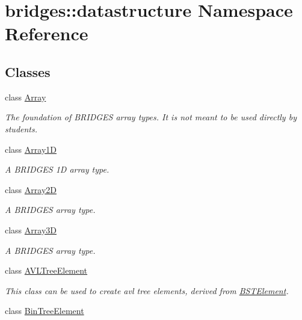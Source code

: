 \hypertarget{namespacebridges_1_1datastructure}{}\section{bridges\+:\+:datastructure Namespace Reference}
\label{namespacebridges_1_1datastructure}
\subsection*{Classes}
\begin{DoxyCompactItemize}
\item 
class \mbox{\hyperlink{classbridges_1_1datastructure_1_1_array}{Array}}
\begin{DoxyCompactList}\small\item\em The foundation of B\+R\+I\+D\+G\+ES array types. It is not meant to be used directly by students. \end{DoxyCompactList}\item 
class \mbox{\hyperlink{classbridges_1_1datastructure_1_1_array1_d}{Array1D}}
\begin{DoxyCompactList}\small\item\em A B\+R\+I\+D\+G\+ES 1D array type. \end{DoxyCompactList}\item 
class \mbox{\hyperlink{classbridges_1_1datastructure_1_1_array2_d}{Array2D}}
\begin{DoxyCompactList}\small\item\em A B\+R\+I\+D\+G\+ES array type. \end{DoxyCompactList}\item 
class \mbox{\hyperlink{classbridges_1_1datastructure_1_1_array3_d}{Array3D}}
\begin{DoxyCompactList}\small\item\em A B\+R\+I\+D\+G\+ES array type. \end{DoxyCompactList}\item 
class \mbox{\hyperlink{classbridges_1_1datastructure_1_1_a_v_l_tree_element}{A\+V\+L\+Tree\+Element}}
\begin{DoxyCompactList}\small\item\em This class can be used to create avl tree elements, derived from \mbox{\hyperlink{classbridges_1_1datastructure_1_1_b_s_t_element}{B\+S\+T\+Element}}. \end{DoxyCompactList}\item 
class \mbox{\hyperlink{classbridges_1_1datastructure_1_1_bin_tree_element}{Bin\+Tree\+Element}}

\end{DoxyCompactItemize}
